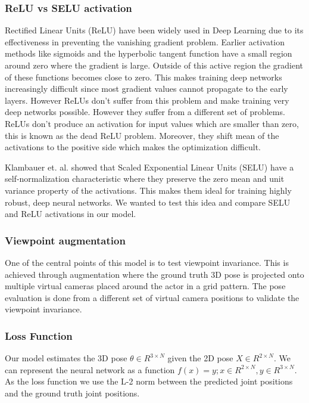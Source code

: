 \subsubsection{ReLU vs SELU activation}

Rectified Linear Units (ReLU) \parencite{nair2010rectified} have been widely used in Deep Learning due to its effectiveness in preventing the vanishing gradient problem. Earlier activation methods like sigmoids and the hyperbolic tangent function have a small region around zero where the gradient is large. Outside of this active region the gradient of these functions becomes close to zero. This makes training deep networks increasingly difficult since most gradient values cannot propagate to the early layers. However ReLUs don't suffer from this problem and make training very deep networks possible. However they suffer from a different set of problems. ReLUs don't produce an activation for input values which are smaller than zero, this is known as the dead ReLU problem. Moreover, they shift mean of the activations to the positive side which makes the optimization difficult. 

Klambauer et. al. \parencite{klambauer2017self} showed that Scaled Exponential Linear Units (SELU) have a self-normalization characteristic where they preserve the zero mean and unit variance property of the activations. This makes them ideal for training highly robust, deep neural networks. We wanted to test this idea and compare SELU and ReLU activations in our model.

\subsubsection{Viewpoint augmentation}

One of the central points of this model is to test viewpoint invariance. This is achieved through augmentation where the ground truth 3D pose is projected onto multiple virtual cameras placed around the actor in a grid pattern. The pose evaluation is done from a different set of virtual camera positions to validate the viewpoint invariance. %

\subsubsection{Loss Function}

Our model estimates the 3D pose $\theta \in R^{3\times N}$ given the 2D pose $X \in R^{2\times N}$. We can represent the neural network as a function $f(x) = y ; x \in R^{2\times N}, y \in R^{3\times N} $. As the loss function we use the L-2 norm between the predicted joint positions and the ground truth joint positions.


